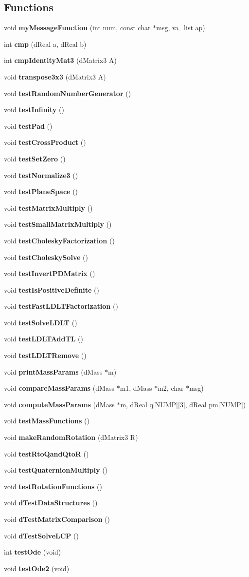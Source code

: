 \subsection*{Functions}
\begin{CompactItemize}
\item 
void {\bf my\-Message\-Function} (int num, const char $\ast$msg, va\_\-list ap)
\item 
int {\bf cmp} (d\-Real a, d\-Real b)
\item 
int {\bf cmp\-Identity\-Mat3} (d\-Matrix3 A)
\item 
void {\bf transpose3x3} (d\-Matrix3 A)
\item 
void {\bf test\-Random\-Number\-Generator} ()
\item 
void {\bf test\-Infinity} ()
\item 
void {\bf test\-Pad} ()
\item 
void {\bf test\-Cross\-Product} ()
\item 
void {\bf test\-Set\-Zero} ()
\item 
void {\bf test\-Normalize3} ()
\item 
void {\bf test\-Plane\-Space} ()
\item 
void {\bf test\-Matrix\-Multiply} ()
\item 
void {\bf test\-Small\-Matrix\-Multiply} ()
\item 
void {\bf test\-Cholesky\-Factorization} ()
\item 
void {\bf test\-Cholesky\-Solve} ()
\item 
void {\bf test\-Invert\-PDMatrix} ()
\item 
void {\bf test\-Is\-Positive\-Definite} ()
\item 
void {\bf test\-Fast\-LDLTFactorization} ()
\item 
void {\bf test\-Solve\-LDLT} ()
\item 
void {\bf test\-LDLTAdd\-TL} ()
\item 
void {\bf test\-LDLTRemove} ()
\item 
void {\bf print\-Mass\-Params} (d\-Mass $\ast$m)
\item 
void {\bf compare\-Mass\-Params} (d\-Mass $\ast$m1, d\-Mass $\ast$m2, char $\ast$msg)
\item 
void {\bf compute\-Mass\-Params} (d\-Mass $\ast$m, d\-Real q[NUMP][3], d\-Real pm[NUMP])
\item 
void {\bf test\-Mass\-Functions} ()
\item 
void {\bf make\-Random\-Rotation} (d\-Matrix3 R)
\item 
void {\bf test\-Rto\-Qand\-Qto\-R} ()
\item 
void {\bf test\-Quaternion\-Multiply} ()
\item 
void {\bf test\-Rotation\-Functions} ()
\item 
void {\bf d\-Test\-Data\-Structures} ()
\item 
void {\bf d\-Test\-Matrix\-Comparison} ()
\item 
void {\bf d\-Test\-Solve\-LCP} ()
\item 
int {\bf test\-Ode} (void)
\item 
void {\bf test\-Ode2} (void)
\end{CompactItemize}
